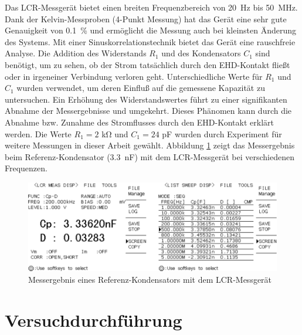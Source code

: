 Das LCR-Messgerät bietet einen breiten Frequenzbereich von \SI{20}{\Hz} bis \SI{50}{\MHz}.
Dank der Kelvin-Messproben (4-Punkt Messung) hat das Gerät eine sehr gute Genauigkeit von \SI{0.1}{\percent} und ermöglicht die Messung auch bei kleinsten Änderung des Systems.
Mit einer Sinuskorrelationstechnik bietet das Gerät eine rauschfreie Analyse.
Die Addition des Widerstands $R_1$ und des Kondensators $C_1$ sind benötigt, um zu sehen, ob der Strom tatsächlich durch den EHD-Kontakt fließt oder in irgeneiner Verbindung verloren geht.
Unterschiedliche Werte für $R_1$ und $C_1$ wurden verwendet, um deren Einfluß auf die gemessene Kapazität zu untersuchen.
Ein Erhöhung des Widerstandswertes führt zu einer signifikanten Abnahme der Messergebnisse und umgekehrt.
Dieses Phänomen kann durch die Abnahme bzw. Zunahme des Stromflusses durch den EHD-Kontakt erklärt werden.
Die Werte $R_1 = 2$ \si{\kilo\ohm} und $C_1 = 24$ \si{\pico\farad} wurden durch Experiment für weitere Messungen in dieser Arbeit gewählt.
Abbildung \ref{fig:messprobe_eines_mit_dem_lcr_meter} zeigt das Messergebnis beim Referenz-Kondensator (\SI{3.3}{\nano\F}) mit dem LCR-Messgerät bei verschiedenen Frequenzen.
\begin{figure}[htb]
    \centering
    \includegraphics[]{./images/messprobe_mit_lcr_meter.pdf}
    \caption{Messergebnis eines Referenz-Kondensators mit dem LCR-Messgerät}
    \label{fig:messprobe_eines_mit_dem_lcr_meter}
\end{figure}


\section{Versuchdurchführung}
\label{sec:versuchdurchfuehrung}


